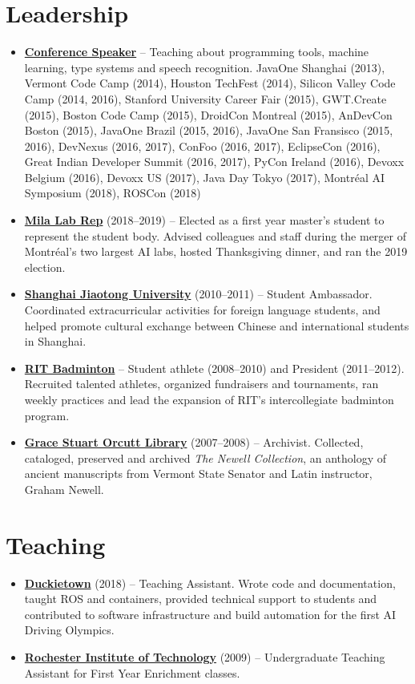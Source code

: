 \documentclass[letterpaper,11pt]{article}
\newcommand{\resumeItem}[2]{
\item\small{
\textbf{#1}{ #2 \vspace{-2pt}}
}
}
\newcommand{\resumeSubItem}[2]{\resumeItem{#1}{#2}}
\newcommand{\resumeSubHeadingListStart}{\begin{itemize}[leftmargin=*]}
\newcommand{\resumeSubHeadingListEnd}{\end{itemize}}
\begin{document}
\begin{justify}
\section{Leadership}
\resumeSubHeadingListStart
\resumeSubItem{\href{https://speakerdeck.com/breandan}{Conference Speaker}} {-- Teaching about programming tools, machine learning, type systems and speech recognition. JavaOne Shanghai (2013), Vermont Code Camp (2014), Houston TechFest (2014), Silicon Valley Code Camp (2014, 2016), Stanford University Career Fair (2015), GWT.Create (2015), Boston Code Camp (2015), DroidCon Montreal (2015), AnDevCon Boston (2015), JavaOne Brazil (2015, 2016), JavaOne San Fransisco (2015, 2016), DevNexus (2016, 2017), ConFoo (2016, 2017), EclipseCon (2016), Great Indian Developer Summit (2016, 2017), PyCon Ireland (2016), Devoxx Belgium (2016), Devoxx US (2017), Java Day Tokyo (2017), Montr\'eal AI Symposium (2018), ROSCon (2018)}
\resumeSubItem{\href{https://mila.quebec/}{Mila Lab Rep}} {(2018--2019) -- Elected as a first year master's student to represent the student body. Advised colleagues and staff during the merger of Montr\'eal's two largest AI labs, hosted Thanksgiving dinner, and ran the 2019 election.}
\resumeSubItem{\href{https://www.sjtu.edu.cn/}{Shanghai Jiaotong University}} {(2010--2011) -- Student Ambassador. Coordinated extracurricular activities for foreign language students, and helped promote cultural exchange between Chinese and international students in Shanghai.}
\resumeSubItem{\href{https://www.rit.edu/sg/badminton/}{RIT Badminton}} {-- Student athlete (2008--2010) and President (2011--2012). Recruited talented athletes, organized fundraisers and tournaments, ran weekly practices and lead the expansion of RIT's intercollegiate badminton program.}
\resumeSubItem{\href{https://www.stjacademy.org/academics/library}{Grace Stuart Orcutt Library}} {(2007--2008) -- Archivist. Collected, cataloged, preserved and archived \textit{The Newell Collection}, an anthology of ancient manuscripts from Vermont State Senator and Latin instructor, Graham Newell.}
\resumeSubHeadingListEnd

\section{Teaching}
\resumeSubHeadingListStart
\resumeSubItem{\href{http://duckietown.org/}{Duckietown}}{(2018) -- Teaching Assistant. Wrote code and documentation, taught ROS and containers, provided technical support to students and contributed to software infrastructure and build automation for the first AI Driving Olympics.}
\resumeSubItem{\href{https://www.rit.edu}{Rochester Institute of Technology}}{(2009) -- Undergraduate Teaching Assistant for First Year Enrichment classes.}
\resumeSubHeadingListEnd


\end{justify}
\end{document}

